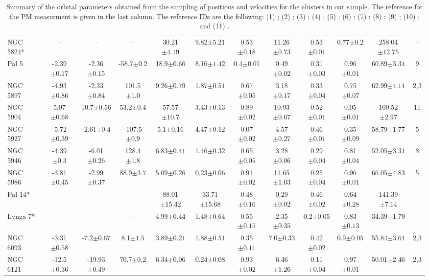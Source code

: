 \begin{landscape}
\begin{table}
\begin{tabular}{lccccccccccc}
NGC 5824* & -- & -- & -- & 30.21$\pm{4.19}$ & 9.82$\pm{5.21}$ & 0.53$\pm{0.18}$ & 11.26$\pm{0.73}$ & 0.53$\pm{0.01}$ & 0.77$\pm{0.2}$ & 258.04$\pm{12.75}$&-- \\ 
Pal 5 & -2.39$\pm{0.17}$ & -2.36$\pm{0.15}$ & -58.7$\pm{0.2}$ & 18.9$\pm{0.66}$ & 8.16$\pm{1.42}$ & 0.4$\pm{0.07}$ & 0.49$\pm{0.02}$ & 0.31$\pm{0.03}$ & 0.96$\pm{0.01}$ & 60.89$\pm{3.31}$&9 \\ 
NGC 5897 & -4.93$\pm{0.86}$ & -2.33$\pm{0.84}$ & 101.5$\pm{1.0}$ & 9.26$\pm{0.79}$ & 1.87$\pm{0.51}$ & 0.67$\pm{0.05}$ & 3.18$\pm{0.17}$ & 0.33$\pm{0.04}$ & 0.75$\pm{0.07}$ & 62.99$\pm{4.14}$&2,3 \\ 
NGC 5904 & 5.07$\pm{0.68}$ & 10.7$\pm{0.56}$ & 53.2$\pm{0.4}$ & 57.57$\pm{10.7}$ & 3.43$\pm{0.13}$ & 0.89$\pm{0.02}$ & 10.93$\pm{0.67}$ & 0.52$\pm{0.01}$ & 0.05$\pm{0.01}$ & 100.52$\pm{2.97}$&11 \\ 
NGC 5927 & -5.72$\pm{0.39}$ & -2.61$\pm{0.4}$ & -107.5$\pm{0.9}$ & 5.1$\pm{0.16}$ & 4.47$\pm{0.12}$ & 0.07$\pm{0.02}$ & 4.57$\pm{0.27}$ & 0.46$\pm{0.01}$ & 0.35$\pm{0.09}$ & 58.79$\pm{1.77}$&5 \\ 
NGC 5946 & -4.39$\pm{0.3}$ & -6.01$\pm{0.26}$ & 128.4$\pm{1.8}$ & 6.83$\pm{0.41}$ & 1.46$\pm{0.32}$ & 0.65$\pm{0.05}$ & 3.28$\pm{0.06}$ & 0.29$\pm{0.04}$ & 0.81$\pm{0.04}$ & 52.05$\pm{3.31}$&8 \\ 
NGC 5986 & -3.81$\pm{0.45}$ & -2.99$\pm{0.37}$ & 88.9$\pm{3.7}$ & 5.09$\pm{0.26}$ & 0.23$\pm{0.06}$ & 0.91$\pm{0.02}$ & 11.65$\pm{1.03}$ & 0.25$\pm{0.04}$ & 0.96$\pm{0.01}$ & 66.05$\pm{4.83}$&5 \\ 
Pal 14* & -- & -- & -- & 88.01$\pm{15.42}$ & 33.71$\pm{15.68}$ & 0.48$\pm{0.16}$ & 0.29$\pm{0.02}$ & 0.46$\pm{0.02}$ & 0.64$\pm{0.28}$ & 141.39$\pm{7.14}$&-- \\ 
Lynga 7* & -- & -- & -- & 4.99$\pm{0.44}$ & 1.48$\pm{0.64}$ & 0.55$\pm{0.15}$ & 2.35$\pm{0.35}$ & 0.2$\pm{0.05}$ & 0.83$\pm{0.13}$ & 34.39$\pm{1.79}$&-- \\ 
NGC 6093 & -3.31$\pm{0.58}$ & -7.2$\pm{0.67}$ & 8.1$\pm{1.5}$ & 3.89$\pm{0.21}$ & 1.88$\pm{0.51}$ & 0.35$\pm{0.11}$ & 7.0$\pm{0.33}$ & 0.42$\pm{0.02}$ & 0.9$\pm{0.05}$ & 55.84$\pm{3.61}$&2,3 \\ 
NGC 6121 & -12.5$\pm{0.36}$ & -19.93$\pm{0.49}$ & 70.7$\pm{0.2}$ & 6.34$\pm{0.06}$ & 0.24$\pm{0.08}$ & 0.93$\pm{0.02}$ & 6.46$\pm{1.26}$ & 0.11$\pm{0.04}$ & 0.97$\pm{0.01}$ & 50.01$\pm{2.46}$&2,3 \\ 

\hline
\end{tabular}
\caption{Summary of the orbital parameters obtained from the sampling of
positions and velocities for the clusters in our sample. The reference for the
PM measurment is given in the last column.  The reference IDs are the following: (1)
\citet{Dinescu97}; (2) \citet{Dinescu99}; (3) \citet{Dinescu99b}; (4)
\citet{Dinescu03}; (5) \citet{Dinescu07}; (6) \citet{Dinescu10}; (7)
\citet{Dinescu13}; (8) \citet{Dambis06}; (9) \citet{Kuepper15}; (10)
\citet{Rossi15}; and (11) \citet{Scholtz96}.}
\label{summary}
\end{table}
\end{landscape}


